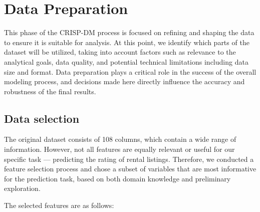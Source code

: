 \section{Data Preparation}\label{chap:dataPreparation}
This phase of the CRISP-DM process is focused on refining and shaping the data to ensure it is suitable for analysis. At this point, we identify which parts of the dataset will be utilized, taking into account factors such as relevance to the analytical goals, data quality, and potential technical limitations including data size and format. Data preparation plays a critical role in the success of the overall modeling process, and decisions made here directly influence the accuracy and robustness of the final results.

\subsection{Data selection }\label{sec:dataSelection}
The original dataset consists of 108 columns, which contain a wide range of information. However, not all features are equally relevant or useful for our specific task --- predicting the rating of rental listings. Therefore, we conducted a feature selection process and chose a subset of variables that are most informative for the prediction task, based on both domain knowledge and preliminary exploration.

The selected features are as follows:

